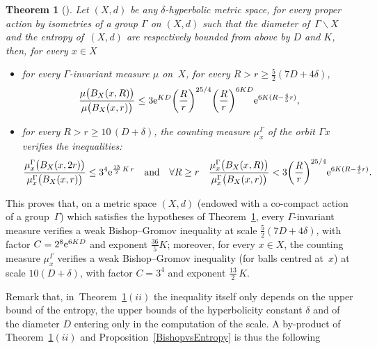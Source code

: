 \documentclass[pdftex]{sigma}
\numberwithin{equation}{section}
\newtheorem{theor}{Theorem}[section]
\begin{document}
\begin{theor} [{\cite[Theorem~5.1]{BCGS}}]\label{cocompact2}
Let $(X, d) $ be any $ \delta$-hyperbolic metric space, for every proper
action
by isometries of a group $\Gamma$ on $(X,d)$ such that the diameter of~$\Gamma \backslash X$ and the
entropy of~$(X, d) $ are respectively bounded from above by $D$ and $K$,
then, for every $x \in X$
\begin{itemize}\itemsep=0pt
\item[$(i)$]
for every $\Gamma$-invariant measure $\mu$ on~$X$, for every $
R > r \ge \frac{5}{2} (7 D + 4 \delta)$,
\begin{gather*}
\dfrac{\mu \big(B_X(x, R)\big)}{\mu \big(B_X(x, r)\big)}
\le 3 {\rm e}^{K D} \bigg(\frac{R}{r} \bigg)^{25/4} \bigg(\frac{R}{r}\bigg)^{6 K D}
{\rm e}^{6 K (R - \frac{4}{5} r)},
\end{gather*}

\item[$(ii)$]
for every $R > r \ge 10\,(D + \delta)$, the counting measure
$\mu^\Gamma_x$ of the orbit $\Gamma x$ verifies the inequalities:
\begin{gather*}
\dfrac{\mu_{x}^{\Gamma} \big(B_X (x, 2r)\big)}{\mu_{x}^{\Gamma} \big(B_X (x, r)\big)}
\le 3^4 {\rm e}^{\frac{13}{2} \,K\, r}\quad
\text{and} \quad
\forall R \ge r \quad
\dfrac{\mu_{x}^{\Gamma}\big(B_X(x, R)\big)}{\mu_{x}^{\Gamma} \big(B_X(x, r)\big)}
< 3 \bigg(\frac{R}{r}\bigg)^{25/4} {\rm e}^{6 K (R- \frac{4}{5} r)}.
\end{gather*}
\end{itemize}
\end{theor}

This proves that, on a metric space $ (X,d)$ (endowed with a co-compact action of a group~$\Gamma$) which satisfies the hypotheses of Theorem~\ref{cocompact2},
every $\Gamma$-invariant measure verifies a weak Bishop--Gromov inequality at scale $\frac{5}{2} (7 D + 4 \delta)$, with factor $C = 2^{8} {\rm e}^{6 K D}$
and exponent $\frac{36}{5} K$; moreover, for every $x \in X$, the counting measure $\mu_{x}^{\Gamma}$ verifies a weak
Bishop--Gromov inequality (for balls centred at~$x$) at scale $10 (D + \delta)$, with factor $C = 3^{4}$ and exponent $\frac{13}{2} \,K$.

Remark that, in~Theorem~\ref{cocompact2}$(ii)$ the inequality itself only depends on the upper bound of the entropy, the upper bounds of the hyperbolicity
constant $\delta$ and of the diameter $D$ entering only in the computation of the scale. A by-product of Theorem~\ref{cocompact2}$(ii)$ and Proposition~\ref{BishopvsEntropy} is thus the following
\end{document}

